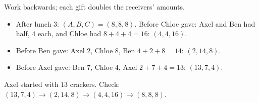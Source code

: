 Work backwards; each gift doubles the receivers' amounts.
\begin{itemize}
\item After lunch 3: $(A,B,C)=(8,8,8)$. Before Chloe gave: Axel and Ben had half, $4$ each, and Chloe had $8+4+4=16$: $(4,4,16)$.
\item Before Ben gave: Axel $2$, Chloe $8$, Ben $4+2+8=14$: $(2,14,8)$.
\item Before Axel gave: Ben $7$, Chloe $4$, Axel $2+7+4=13$: $(13,7,4)$.
\end{itemize}
Axel started with $\boxed{13}$ crackers. Check: $(13,7,4)\to(2,14,8)\to(4,4,16)\to(8,8,8)$.
